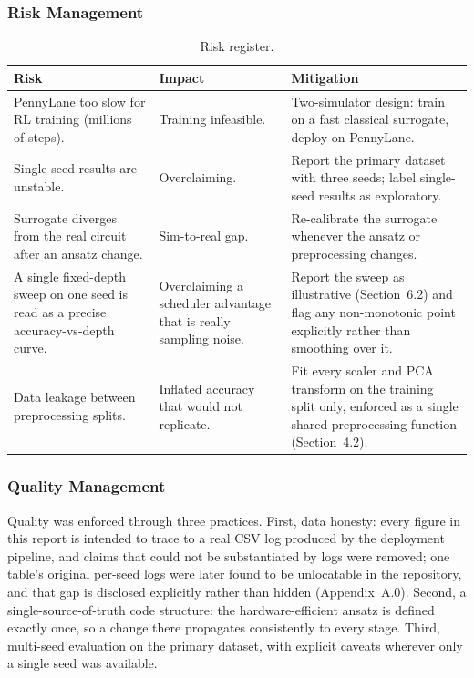 \subsubsection{Risk Management}
\begin{table}[htbp]
\centering
\caption{Risk register.}
\label{tab:risk}
\begin{tabular}{|p{5cm}|p{2.5cm}|p{6.5cm}|}
\hline
\textbf{Risk} & \textbf{Impact} & \textbf{Mitigation} \\
\hline
PennyLane too slow for RL training (millions of steps). & Training infeasible. & Two-simulator design: train on a fast classical surrogate, deploy on PennyLane. \\
Single-seed results are unstable. & Overclaiming. & Report the primary dataset with three seeds; label single-seed results as exploratory. \\
Surrogate diverges from the real circuit after an ansatz change. & Sim-to-real gap. & Re-calibrate the surrogate whenever the ansatz or preprocessing changes. \\
A single fixed-depth sweep on one seed is read as a precise accuracy-vs-depth curve. & Overclaiming a scheduler advantage that is really sampling noise. & Report the sweep as illustrative (Section~6.2) and flag any non-monotonic point explicitly rather than smoothing over it. \\
Data leakage between preprocessing splits. & Inflated accuracy that would not replicate. & Fit every scaler and PCA transform on the training split only, enforced as a single shared preprocessing function (Section~4.2). \\
\hline
\end{tabular}
\end{table}

\subsubsection{Quality Management}
Quality was enforced through three practices. First, data honesty: every figure in this report is intended to trace to a real CSV log produced by the deployment pipeline, and claims that could not be substantiated by logs were removed; one table's original per-seed logs were later found to be unlocatable in the repository, and that gap is disclosed explicitly rather than hidden (Appendix~A.0). Second, a single-source-of-truth code structure: the hardware-efficient ansatz is defined exactly once, so a change there propagates consistently to every stage. Third, multi-seed evaluation on the primary dataset, with explicit caveats wherever only a single seed was available.

